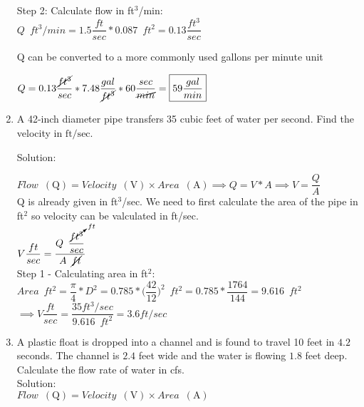\begin{enumerate}[1.]
Step 2: Calculate flow in ft$^3$/min:\\

$ Q \enspace ft^3/min = 1.5 \dfrac{ft}{sec}*0.087 \enspace ft^2 = 0.13 \dfrac{ft^3}{sec}$\\

\vspace{0.2cm}

Q can be converted to a more commonly used gallons per minute unit

\vspace{0.2cm}

$Q=0.13 \dfrac{\cancel{ft^3}}{sec}*7.48\dfrac{gal}{\cancel{ft^3}}*60\dfrac{sec}{\cancel{min}}=\boxed{59 \dfrac{gal}{min}}$
  \item A 42-inch diameter pipe transfers 35 cubic feet of water per second. Find the velocity in $\mathrm{ft} / \mathrm{sec}$. 

  Solution:\\
\vspace{0.2cm}

$Flow \enspace(\mathrm{Q})= Velocity \enspace(\mathrm{V})  \times Area \enspace(\mathrm{A}) \implies Q=V*A \implies V=\dfrac{Q}{A}$\\
Q is already given in ft${^3}$/sec.  We need to first calculate the area of the pipe in ft${^2}$ so velocity can be valculated in ft/sec.\\
\vspace{0.2cm}
$ V \dfrac{ft}{sec} = \dfrac{Q \enspace \dfrac{\cancelto{ft}{ft^3}}{sec}}{A \enspace\cancel{ft}}$\\
\vspace{0.2cm}
Step 1 - Calculating area in ft${^2}$:\\
\vspace{0.2cm}
$Area \enspace ft^2= \dfrac{\pi}{4}*D^2= 0.785*\Big(\dfrac{42}{12}\Big)^2 \enspace ft^2=0.785*\dfrac{1764}{144}=9.616 \enspace ft^2$\\
\vspace{0.2cm}
$\implies V \dfrac{ft}{sec} = \dfrac{ 35 ft^3/sec}{9.616 \enspace ft^2} = \boxed{3.6 ft/sec}$\\
\vspace{0.3cm} 

  
  \item A plastic float is dropped into a channel and is found to travel 10 feet in $4.2$ seconds. The channel is $2.4$ feet wide and the water is flowing $1.8$ feet deep. Calculate the flow rate of water in cfs.\\
  \vspace{0.2cm}
  Solution:\\
  $Flow \enspace(\mathrm{Q})= Velocity \enspace(\mathrm{V})  \times Area \enspace(\mathrm{A})$\\


\end{enumerate}
